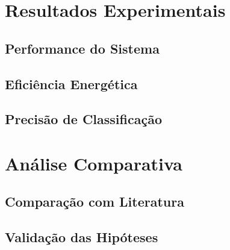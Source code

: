 
\section{Resultados Experimentais}


\subsection{Performance do Sistema}


\subsection{Eficiência Energética}


\subsection{Precisão de Classificação}


\section{Análise Comparativa}


\subsection{Comparação com Literatura}


\subsection{Validação das Hipóteses}


